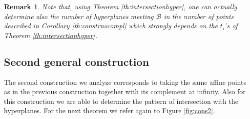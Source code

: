 \documentclass[11pt]{amsart}
\DeclareMathOperator{\rk}{rk}
\newtheorem{remark}[theorem]{Remark}
\begin{document}

\begin{remark}
Note that, using Theorem \ref{th:intersectionhyper}, one can actually determine also the number of hyperplanes meeting $\mathcal{B}$ in the number of points described in Corollary \ref{th:constrnocompl} which strongly depends on the $t_i$'s of Theorem \ref{th:intersectionhyper}. 
\end{remark}

\subsection{Second general construction}\label{sec:constr2}

The second construction we analyze corresponds to taking the same affine points as in the previous construction together with its complement at infinity. Also for this construction we are able to determine the pattern of intersection with the hyperplanes.
For the next theorem we refer again to Figure \ref{fig:cons2}.
\end{document}
